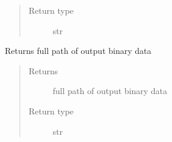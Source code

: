 \documentclass[letterpaper,10pt,english]{sphinxmanual}
\begin{document}
\begin{fulllineitems}
\begin{fulllineitems}
\begin{quote}
\begin{description}
\item[{Return type}] \leavevmode
str

\end{description}\end{quote}

\end{fulllineitems}


\begin{fulllineitems}
\label{\detokenize{MouseReferenceManual:Modules.Base.ContinuumModuleBaseClass.outputFileName}}
Returns full path of output binary data
\begin{quote}\begin{description}
\item[{Returns}] \leavevmode
full path of output binary data

\item[{Return type}] \leavevmode
str

\end{description}\end{quote}

\end{fulllineitems}


\end{fulllineitems}

\end{document}
